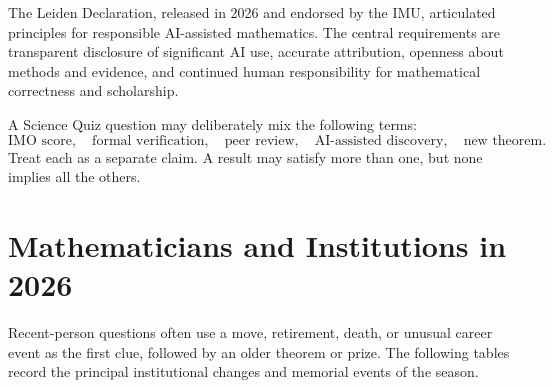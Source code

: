     \begin{fact}
        The Leiden Declaration, released in 2026 and endorsed by the IMU,
        articulated principles for responsible AI-assisted mathematics. The
        central requirements are transparent disclosure of significant AI use,
        accurate attribution, openness about methods and evidence, and continued
        human responsibility for mathematical correctness and scholarship.
    \end{fact}

    \begin{strategy}
        A Science Quiz question may deliberately mix the following terms:
        \[
            \text{IMO score},\quad
            \text{formal verification},\quad
            \text{peer review},\quad
            \text{AI-assisted discovery},\quad
            \text{new theorem}.
        \]
        Treat each as a separate claim. A result may satisfy more than one, but
        none implies all the others.
    \end{strategy}

    \chapter{Mathematicians and Institutions in 2026}

    Recent-person questions often use a move, retirement, death, or unusual
    career event as the first clue, followed by an older theorem or prize. The
    following tables record the principal institutional changes and memorial
    events of the season.

    \vspace{1em}

